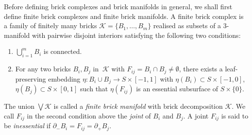 \documentclass{amsart}
\theoremstyle{definition}
\numberwithin{figure}{section}
\numberwithin{equation}{section}
\def\ck{\mathcal{K}}
\def\eset{\emptyset}
\def\part{\partial}
\begin{document}

Before defining  brick complexes and brick manifolds in general, we shall first define finite brick complexes and finite  brick manifolds.
A finite brick complex is a family of finitely many bricks $\ck=\{B_1, \dots , B_m\}$ realised as subsets of a 3-manifold  with pairwise disjoint interiors satisfying the following two conditions:
\begin{enumerate}
\item $\bigcup_{i=1}^m  B_i$ is connected.
\item For any two bricks $ B_i, B_j$ in $\ \ck$ with $ F_{ij}=  B_i\cap   B_j\neq \eset$,  there exists a leaf-preserving embedding 
$\eta: B_i\cup   B_j\rightarrow S\times [-1,1]$ with $\eta(  B_i)\subset S\times [-1,0]$, $\eta (B_j)\subset 
S\times [0,1]$ such that $\eta(F_{ij})$ is an   essential subsurface of $S\times \{0\}$.
\end{enumerate}
The union $\bigvee  \ck$ is called a \emph{finite brick manifold} with brick decomposition $\ck$.
We call $F_{ij}$  in the second condition above the \emph{joint} of $ B_i$ and $ B_j$.
A joint $F_{ij}$ is said to be \emph{inessential} if 
$\part_-  B_i=  F_{ij}=\part_+   B_j$.
\end{document}
